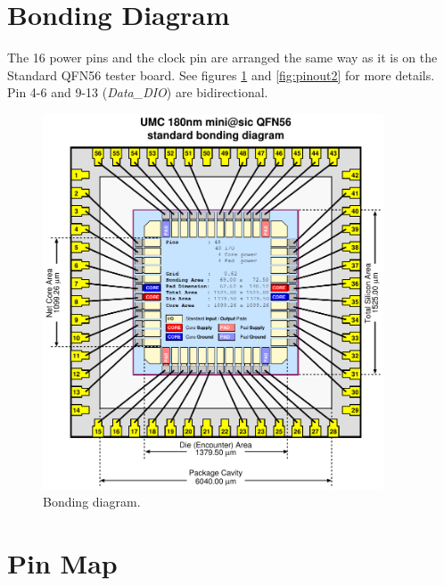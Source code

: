 \section{Bonding Diagram}
The 16 power pins and the clock pin are arranged the same way as it is on the  Standard QFN56 tester board. See figures \ref{fig:bonding} and \ref{fig:pinout2} for more details. Pin 4-6 and 9-13 (\textit{Data\_DIO}) are bidirectional.
\begin{figure}[htbp]

  \centering \includegraphics[width=0.9\textwidth]{./figures/qfn56_180_std}
  \caption{Bonding diagram.}
\label{fig:bonding}
\end{figure}
\clearpage
\section{Pin Map}

